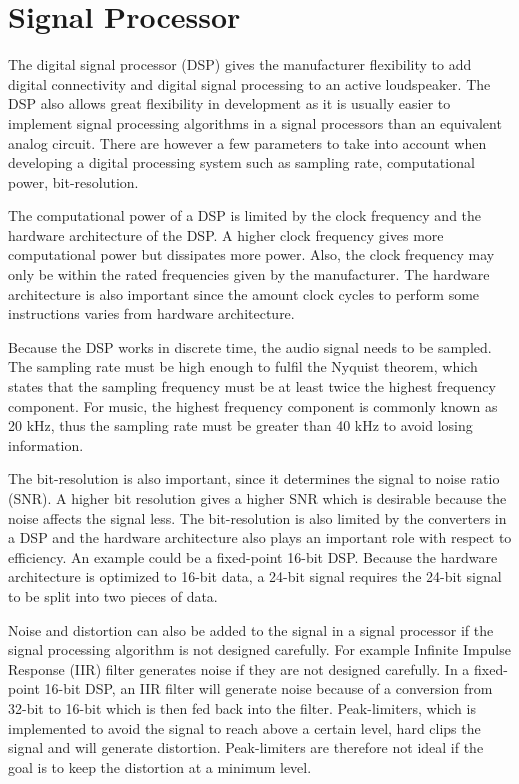 \section{Signal Processor}

The digital signal processor (DSP) gives the manufacturer flexibility to add digital connectivity and digital signal processing to an active loudspeaker. The DSP also allows great flexibility in development as it is usually easier to implement signal processing algorithms in a signal processors than an equivalent analog circuit. There are however a few parameters to take into account when developing a digital processing system such as sampling rate, computational power, bit-resolution. 

The computational power of a DSP is limited by the clock frequency and the hardware architecture of the DSP. A higher clock frequency gives more computational power but dissipates more power. Also, the clock frequency may only be within the rated frequencies given by the manufacturer. The hardware architecture is also important since the amount clock cycles to perform some instructions varies from hardware architecture.

Because the DSP works in discrete time, the audio signal needs to be sampled. The sampling rate must be high enough to fulfil the Nyquist theorem, which states that the sampling frequency must be at least twice the highest frequency component. For music, the highest frequency component is commonly known as 20 kHz, thus the sampling rate must be greater than 40 kHz to avoid losing information.

The bit-resolution is also important, since it determines the signal to noise ratio (SNR). A higher bit resolution gives a higher SNR which is desirable because the noise affects the signal less. The bit-resolution is also limited by the converters in a DSP and the hardware architecture also plays an important role with respect to efficiency. An example could be a fixed-point 16-bit DSP. Because the hardware architecture is optimized to 16-bit data, a 24-bit signal requires the 24-bit signal to be split into two pieces of data.

Noise and distortion can also be added to the signal in a signal processor if the signal processing algorithm is not designed carefully. For example Infinite Impulse Response (IIR) filter generates noise if they are not designed carefully. In a fixed-point 16-bit DSP, an IIR filter will generate noise because of a conversion from 32-bit to 16-bit which is then fed back into the filter. Peak-limiters, which is implemented to avoid the signal to reach above a certain level, hard clips the signal and will generate distortion. Peak-limiters are therefore not ideal if the goal is to keep the distortion at a minimum level.

















